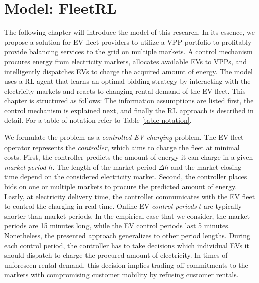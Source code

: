 \documentclass[a4paper, 12pt]{article}
\begin{document}

\section{Model: FleetRL}
\label{sec:org03b19ea}
The following chapter will introduce the model of this research. In its essence,
we propose a solution for EV fleet providers to utilize a VPP portfolio to
profitably provide balancing services to the grid on multiple markets. A control
mechanism procures energy from electricity markets, allocates available EVs to
VPPs, and intelligently dispatches EVs to charge the acquired amount of energy.
The model uses a RL agent that learns an optimal bidding strategy by interacting
with the electricity markets and reacts to changing rental demand of the EV
fleet. This chapter is structured as follows: The information assumptions are
listed first, the control mechanism is explained next, and finally the RL
approach is described in detail. For a table of notation refer to Table
\ref{table-notation}.

We formulate the problem as a \emph{controlled EV charging} problem. The EV fleet
operator represents the \emph{controller}, which aims to charge the fleet at minimal
costs. First, the controller predicts the amount of energy it can charge in a
given \emph{market period} \(h\). The length of the market period \(\Delta h\) and the
market closing time depend on the considered electricity market. Second, the
controller places bids on one or multiple markets to procure the predicted
amount of energy. Lastly, at electricity delivery time, the controller
communicates with the EV fleet to control the charging in real-time. Online EV
\emph{control periods} \(t\) are typically shorter than market periods. In the
empirical case that we consider, the market periods are 15 minutes long, while
the EV control periods last 5 minutes. Nonetheless, the presented approach
generalizes to other period lengths. During each control period, the controller
has to take decisions which individual EVs it should dispatch to charge the
procured amount of electricity. In times of unforeseen rental demand, this
decision implies trading off commitments to the markets with compromising
customer mobility by refusing customer rentals.
\end{document}
